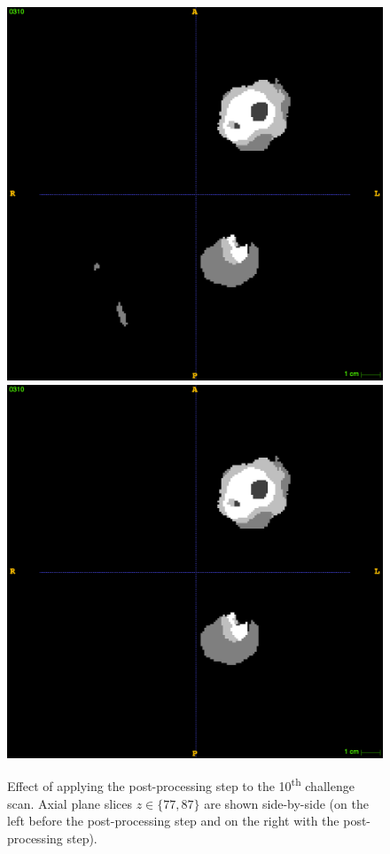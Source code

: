 \documentclass[12pt,a4paper,twoside,openright]{report}
\begin{document}
\begin{figure}[h]
	\vspace{0.5cm}
	\includegraphics[scale = 0.1]{challenge10_no_post_87}
	\includegraphics[scale = 0.1]{challenge10_with_post_87}
	\caption[Effect of applying the post-processing step]{Effect of applying the post-processing step to the 10\textsuperscript{th} challenge scan. Axial plane slices $z \in \{77,87\}$ are shown side-by-side (on the left before the post-processing step and on the right with the post-processing step).}
	\label{fig:connected_components_example}
\end{figure}
\end{document}
